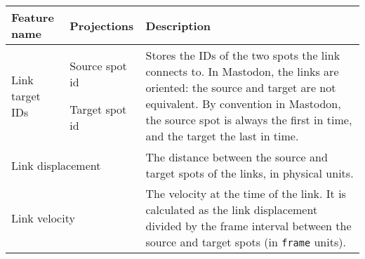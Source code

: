 {
\footnotesize

\begin{tabular}{p{}|p{}|p{}}

    \toprule
    \textbf{Feature name} &
    \textbf{Projections} &
    \textbf{Description}             
    \\ \midrule
    
    Link target IDs & 
    Source spot id
    
    Target spot id &
    Stores the IDs of the two spots the link connects to. 
    In Mastodon, the links are oriented: the source and target are not equivalent. 
    By convention in Mastodon, the source spot is always the first in time, and the target the last in time.
    \\ \midrule

    \multicolumn{2}{l|}{Link displacement} & 
    The distance between the source and target spots of the links, in physical units.
    \\ \midrule
    
    \multicolumn{2}{l|}{Link velocity} & 
    The velocity at the time of the link.
    It is calculated as the link displacement divided by the frame interval between the source and target spots (in \texttt{frame} units).
    \\ \bottomrule

\end{tabular}
}